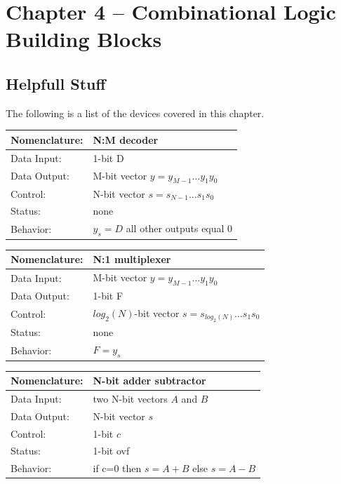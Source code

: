 \section{Chapter 4 -- Combinational Logic Building Blocks}

\subsection{Helpfull Stuff}
The following is a list of the devices covered in this chapter.

\begin{tabular}{|l|p{3.5in}|} \hline
Nomenclature:  & N:M decoder				\\ \hline
Data Input:    & 1-bit D		\\ \hline
Data Output:   & M-bit vector $y = y_{M-1} \ldots y_1 y_0$	\\ \hline
Control:       & N-bit vector $s = s_{N-1} \ldots s_1 s_0$	\\ \hline
Status:        & none					\\ \hline
Behavior:      & $y_s = D$ all other outputs equal 0	\\ \hline
\end{tabular}

\begin{tabular}{|l|p{3.5in}|} \hline
Nomenclature:  & N:1 multiplexer                        \\ \hline
Data Input:    & M-bit vector $y=y_{M-1} \ldots y_1 y_0$    \\ \hline
Data Output:   & 1-bit F          \\ \hline
Control:       & $log_2(N)$-bit vector $s = s_{log_2(N)} \ldots s_1 s_0$	\\ \hline
Status:        & none                                   \\ \hline
Behavior:      & $F = y_s$				\\ \hline
\end{tabular}


\begin{tabular}{|l|p{3.5in}|} \hline
Nomenclature:  & N-bit adder subtractor                 \\ \hline
Data Input:    & two N-bit vectors $A$ and $B$           \\ \hline  
Data Output:   & N-bit vector  $s$               \\ \hline
Control:       & 1-bit $c$                     \\ \hline
Status:        & 1-bit ovf 				\\ \hline
Behavior:      & if c=0 then $s = A+B$ else $s=A-B$     \\ \hline
\end{tabular}


